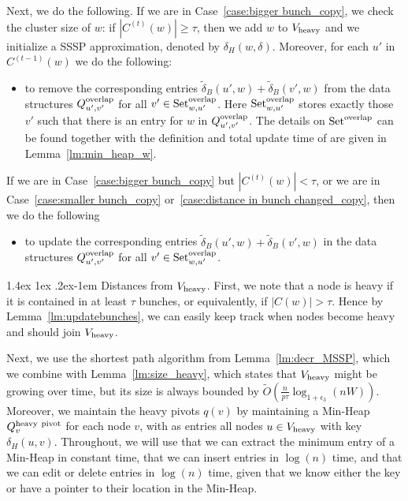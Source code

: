 \documentclass[11pt]{article}
\makeatletter
\theoremstyle{definition}
\theoremstyle{remark}
\renewcommand{\paragraph}{%
  \@startsection{paragraph}{4}%
  {\z@}{1.4ex \@plus 1ex \@minus .2ex}{-1em}%
  {\normalfont\normalsize\bfseries}%
}
\makeatother
\begin{document}
\begin{titlepage}
    Next, we do the following. 
    If we are in Case~\ref{case:bigger bunch_copy}, we check the cluster size of $w$: if $|C^{(t)}(w)|\geq\tau$, then we add $w$ to $V_{\rm{heavy}}$ and we initialize a SSSP approximation, denoted by $\delta_H(w,\delta)$. Moreover, for each $u'$ in $C^{(t-1)}(w)$ we do the following:
\begin{itemize}
    \item {} to remove the corresponding entries $\tilde\delta_B(u',w)+\tilde\delta_B(v',w)$ from the data structures $Q^{\rm{overlap}}_{u',v'}$ for all $v'\in \text{Set}^{\rm{overlap}}_{w,u'}$. Here $\text{Set}^{\rm{overlap}}_{w,u'}$ stores exactly those $v'$ such that there is an entry for $w$ in $Q^{\rm{overlap}}_{u',v'}$. The details on $\text{Set}^{\rm{overlap}}$ can be found together with the definition and total update time of \UpdateOverlapDS are given in Lemma~\ref{lm:min_heap_w}.
\end{itemize}

If we are in Case~\ref{case:bigger bunch_copy} but $|C^{(t)}(w)|<\tau$, or we are in Case~\ref{case:smaller bunch_copy} or~\ref{case:distance in bunch changed_copy}, then we do the following
\begin{itemize}
    \item {} to update the corresponding entries $\tilde\delta_B(u',w)+\tilde\delta_B(v',w)$ in the data structures $Q^{\rm{overlap}}_{u',v'}$ for all $v'\in \text{Set}^{\rm{overlap}}_{w,u'}$. 
\end{itemize}


\paragraph{Distances from $ V_{\rm{heavy}} $.}
First, we note that a node is heavy if it is contained in at least $\tau$ bunches, or equivalently, if $|C(w)|>\tau$. Hence by Lemma~\ref{lm:updatebunches}, we can easily keep track when nodes become heavy and should join $V_{\rm{heavy}}$. 

Next, we use the shortest path algorithm from Lemma~\ref{lm:decr_MSSP}, which we combine with Lemma~\ref{lm:size_heavy}, which states that $V_{\rm{heavy}}$ might be growing over time, but its size is always bounded by $ \tilde O (\tfrac{n }{p\tau}\log_{1+\epsilon_3}(nW)) $. 
Moreover, we maintain the heavy pivots $q(v)$ by maintaining a Min-Heap $Q^{\rm{heavy~pivot}}_v$ for each node $v$, with as entries all nodes $u\in V_{\rm{heavy}}$ with key $\delta_H(u,v)$. Throughout, we will use that we can extract the minimum entry of a Min-Heap in constant time, that we can insert entries in $\log(n)$ time, and that we can edit or delete entries in $\log(n)$ time, given that we know either the key or have a pointer to their location in the Min-Heap. 


\end{titlepage}
\end{document}
